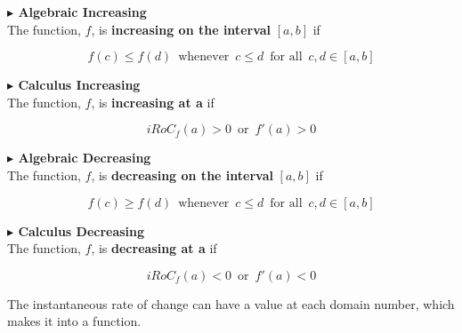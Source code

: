\documentclass{ximera}
\begin{document}
\textbf{\textcolor{red!90!darkgray}{$\blacktriangleright$ Algebraic Increasing}} \\



The function, $f$, is \textbf{\textcolor{purple!85!blue}{increasing on the interval}} $[a, b]$ if


\[
f(c) \leq f(d) \, \text{ whenever } \, c \leq d \, \text{ for all } \, c, d \in [a,b]
\]









\textbf{\textcolor{red!90!darkgray}{$\blacktriangleright$ Calculus Increasing}} \\



The function, $f$, is \textbf{\textcolor{purple!85!blue}{increasing at a}} if


\[
iRoC_f(a) > 0 \, \text{ or } \, f'(a) > 0
\]










\textbf{\textcolor{red!90!darkgray}{$\blacktriangleright$ Algebraic Decreasing}} \\



The function, $f$, is \textbf{\textcolor{purple!85!blue}{decreasing on the interval}} $[a, b]$ if


\[
f(c) \geq f(d) \, \text{ whenever } \, c \leq d \, \text{ for all } \, c, d \in [a,b]
\]









\textbf{\textcolor{red!90!darkgray}{$\blacktriangleright$ Calculus Decreasing}} \\



The function, $f$, is \textbf{\textcolor{purple!85!blue}{decreasing at a}} if


\[
iRoC_f(a) < 0 \, \text{ or } \, f'(a) < 0
\]








The instantaneous rate of change can have a value at each domain number, which makes it into a function.
\end{document}
